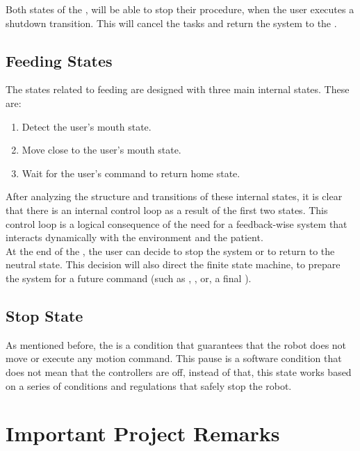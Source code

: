 \documentclass[11pt]{report} %
\begin{document}
Both states of the , will be able to stop their procedure, when the user executes a shutdown transition. This will cancel the tasks and return the system to the .\\


\subsection{Feeding States}

The states related to feeding are designed with three main internal states. These are:\\

\begin{enumerate}
    \item Detect the user's mouth state.
    \item Move close to the user's mouth state.
    \item Wait for the user's command to return home state.
\end{enumerate}

After analyzing the structure and transitions of these internal states, it is clear that there is an internal control loop as a result of the first two states. This control loop is a logical consequence of the need for a feedback-wise system that interacts dynamically with the environment and the patient.\\

At the end of the , the user can decide to stop the system or to return to the neutral state. This decision will also direct the finite state machine, to prepare the system for a future command (such as , , or, a final ).\\

\subsection{Stop State}

As mentioned before, the  is a condition that guarantees that the robot does not move or execute any motion command. This pause is a software condition that does not mean that the controllers are off, instead of that, this state works based on a series of conditions and regulations that safely stop the robot.\\


\section{Important Project Remarks}
\end{document}
